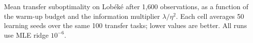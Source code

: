 Mean transfer suboptimality on Lobéké after 1,600 observations, as a function of the warm-up budget and the information multiplier $\lambda/\eta^2$. Each cell averages 50 learning seeds over the same 100 transfer tasks; lower values are better. All runs use MLE ridge $10^{-6}$.
